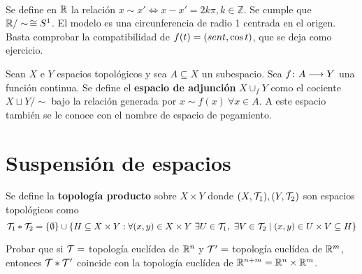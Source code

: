 \documentclass[GTS.tex]{subfiles}
\begin{document}
\begin{ej}\

\end{ej}

\begin{ej} Se define en $\mathbb{R}$ la relación $x\sim x'\Leftrightarrow x-x'=2k\pi,k\in\mathbb{Z}$. Se cumple que $\mathbb{R}/\sim\,\cong S^1$. El modelo es una circunferencia de radio 1 centrada en el origen. Basta comprobar la compatibilidad de $f(t)=(sen t,\cos{t})$, que se deja como ejercicio.
\end{ej}

\begin{defi} Sean $X$ e $Y$ espacios topológicos y sea $A\subseteq X$ un subespacio. Sea $f\colon{A}\longrightarrow{Y}$ una función continua. Se define el \textbf{espacio de adjunción} $X\cup_f Y$ como el cociente $X\sqcup Y/\sim$ bajo la relación generada por $x\sim f(x)\ \forall x\in A$. A este espacio también se le conoce con el nombre de espacio de pegamiento.
\end{defi}

\section{Suspensión de espacios}
\begin{defi}Se define la \textbf{topología producto} sobre $X\times Y$ donde $(X,\mathcal{T}_1), (Y,\mathcal{T}_2)$ son espacios topológicos como
\[
\mathcal{T}_1*\mathcal{T}_2=\{\emptyset\}\cup\{H\subseteq X\times Y:\forall(x,y)\in X\times Y\ \exists U\in\mathcal{T}_1,\ \exists V\in\mathcal{T}_2\mid(x,y)\in U\times V\subseteq H\}
\]
\end{defi}

\begin{ejer}Probar que si $\mathcal{T}=$ topología euclídea de $\mathbb{R}^n$ y $\mathcal{T}'=$ topología euclídea de $\mathbb{R}^m$, entonces $\mathcal{T}*\mathcal{T}'$ coincide con la topología euclídea de $\mathbb{R}^{n+m}=\mathbb{R}^n\times\mathbb{R}^m$.
\end{ejer}
\end{document}
